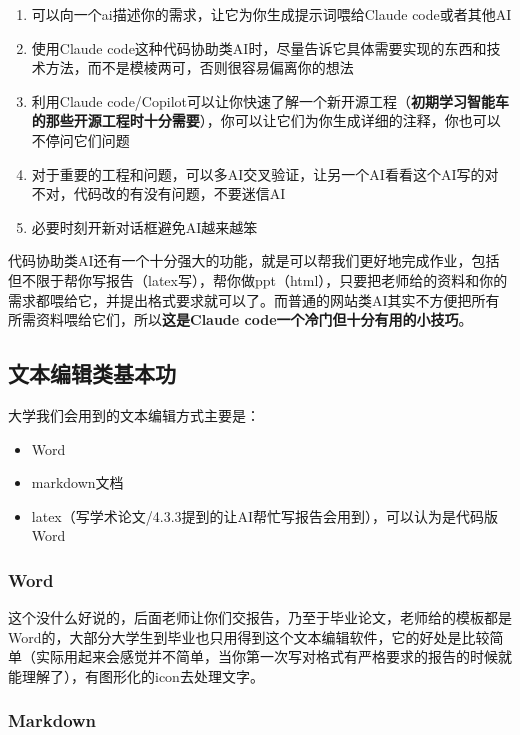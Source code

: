\documentclass[a4paper,12pt]{article}
\begin{document}
\begin{enumerate}
    \item 可以向一个ai描述你的需求，让它为你生成提示词喂给Claude code或者其他AI
    \item 使用Claude code这种代码协助类AI时，尽量告诉它具体需要实现的东西和技术方法，而不是模棱两可，否则很容易偏离你的想法
    \item 利用Claude code/Copilot可以让你快速了解一个新开源工程（\textbf{初期学习智能车的那些开源工程时十分需要}），你可以让它们为你生成详细的注释，你也可以不停问它们问题
    \item 对于重要的工程和问题，可以多AI交叉验证，让另一个AI看看这个AI写的对不对，代码改的有没有问题，不要迷信AI
    \item 必要时刻开新对话框避免AI越来越笨
\end{enumerate}

代码协助类AI还有一个十分强大的功能，就是可以帮我们更好地完成作业，包括但不限于帮你写报告（latex写），帮你做ppt（html），只要把老师给的资料和你的需求都喂给它，并提出格式要求就可以了。而普通的网站类AI其实不方便把所有所需资料喂给它们，所以\textbf{这是Claude code一个冷门但十分有用的小技巧}。

\subsection{文本编辑类基本功}

大学我们会用到的文本编辑方式主要是：

\begin{itemize}
    \item Word
    \item markdown文档
    \item latex（写学术论文/4.3.3提到的让AI帮忙写报告会用到），可以认为是代码版Word
\end{itemize}

\subsubsection{Word}

这个没什么好说的，后面老师让你们交报告，乃至于毕业论文，老师给的模板都是Word的，大部分大学生到毕业也只用得到这个文本编辑软件，它的好处是比较简单（实际用起来会感觉并不简单，当你第一次写对格式有严格要求的报告的时候就能理解了），有图形化的icon去处理文字。

\subsubsection{Markdown}
\end{document}
